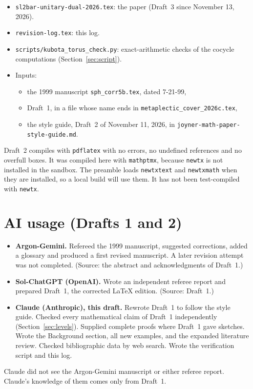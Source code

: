 \documentclass[12pt,letterpaper]{article}
\begin{document}
\begin{itemize}[leftmargin=*]
\item \texttt{sl2bar-unitary-dual-2026.tex}: the paper (Draft~3 since November 13, 2026).
\item \texttt{revision-log.tex}: this log.
\item \texttt{scripts/kubota\_torus\_check.py}: exact-arithmetic checks
  of the cocycle computations (Section~\ref{sec:script}).
\item Inputs:
  \begin{itemize}
  \item the 1999 manuscript \texttt{sph\_corr5b.tex}, dated 7-21-99,
  \item Draft~1, in a file whose name ends in
    \texttt{metaplectic\_cover\_2026c.tex},
  \item the style guide, Draft~2 of November 11, 2026, in
    \texttt{joyner-math-paper-style-guide.md}.
  \end{itemize}
\end{itemize}

Draft~2 compiles with \texttt{pdflatex} with no errors, no undefined
references and no overfull boxes. It was compiled here with
\texttt{mathptmx}, because \texttt{newtx} is not installed in the
sandbox. The preamble loads \texttt{newtxtext} and \texttt{newtxmath}
when they are installed, so a local build will use them. It has not
been test-compiled with \texttt{newtx}.

\section{AI usage (Drafts 1 and 2)}\label{sec:ai}

\begin{itemize}[leftmargin=*]
\item \textbf{Argon-Gemini.} Refereed the 1999 manuscript, suggested
  corrections, added a glossary and produced a first revised
  manuscript. A later revision attempt was not completed. (Source: the
  abstract and acknowledgments of Draft~1.)
\item \textbf{Sol-ChatGPT (OpenAI).} Wrote an independent referee
  report and prepared Draft~1, the corrected LaTeX edition. (Source:
  Draft~1.)
\item \textbf{Claude (Anthropic), this draft.} Rewrote Draft~1 to
  follow the style guide. Checked every mathematical claim of Draft~1
  independently (Section~\ref{sec:levels}). Supplied complete proofs
  where Draft~1 gave sketches. Wrote the Background section, all new
  examples, and the expanded literature review. Checked bibliographic
  data by web search. Wrote the verification script and this log.
\end{itemize}
Claude did not see the Argon-Gemini manuscript or either referee
report. Claude's knowledge of them comes only from Draft~1.
\end{document}

